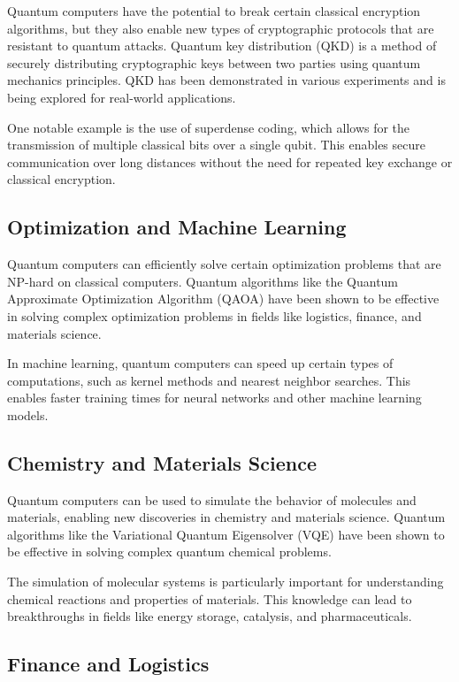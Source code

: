 \documentclass{report}%
\begin{document}
\begin{itemize}
Quantum computers have the potential to break certain classical encryption algorithms, but they also enable new types of cryptographic protocols that are resistant to quantum attacks. Quantum key distribution (QKD) is a method of securely distributing cryptographic keys between two parties using quantum mechanics principles. QKD has been demonstrated in various experiments and is being explored for real-world applications.

One notable example is the use of superdense coding, which allows for the transmission of multiple classical bits over a single qubit. This enables secure communication over long distances without the need for repeated key exchange or classical encryption.

\subsection{Optimization and Machine Learning}

Quantum computers can efficiently solve certain optimization problems that are NP-hard on classical computers. Quantum algorithms like the Quantum Approximate Optimization Algorithm (QAOA) have been shown to be effective in solving complex optimization problems in fields like logistics, finance, and materials science.

In machine learning, quantum computers can speed up certain types of computations, such as kernel methods and nearest neighbor searches. This enables faster training times for neural networks and other machine learning models.

\subsection{Chemistry and Materials Science}

Quantum computers can be used to simulate the behavior of molecules and materials, enabling new discoveries in chemistry and materials science. Quantum algorithms like the Variational Quantum Eigensolver (VQE) have been shown to be effective in solving complex quantum chemical problems.

The simulation of molecular systems is particularly important for understanding chemical reactions and properties of materials. This knowledge can lead to breakthroughs in fields like energy storage, catalysis, and pharmaceuticals.

\subsection{Finance and Logistics}


\end{itemize}
\end{document}
